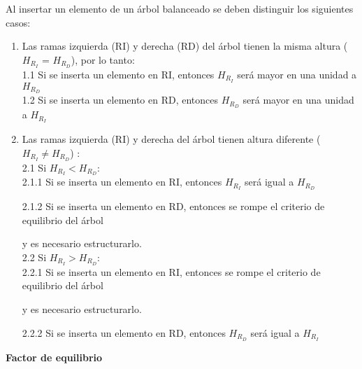 \documentclass{article}
\begin{document}
Al insertar un elemento de un árbol balanceado se deben distinguir los siguientes casos:

\begin{enumerate}
\item Las ramas izquierda (RI) y derecha (RD) del árbol tienen la misma altura ($H_{R_I}$ = $H_{R_D}$), por lo tanto:\\

            1.1 Si se inserta un elemento en RI, entonces $H_{R_I}$ será mayor en una unidad a $H_{R_D}$ \\
            1.2 Si se inserta un elemento en RD, entonces $H_{R_D}$ será mayor en una unidad a $H_{R_I}$\\
            
\item Las ramas izquierda (RI) y derecha del árbol tienen altura diferente ($H_{R_I} \neq H_{R_D}$) : \\  

            2.1 Si $H_{R_I} < H_{R_D}$:\\
            
\hspace{1cm} 2.1.1 Si se inserta un elemento en RI, entonces $H_{R_I}$ será igual a $H_{R_D}$

\hspace{1cm} 2.1.2 Si se inserta un elemento en RD, entonces se rompe el criterio de 
equilibrio del árbol 

\hspace{1.8cm} y es necesario estructurarlo.\\

            2.2 Si $H_{R_I} > H_{R_D}$:\\
            
\hspace{1cm} 2.2.1 Si se inserta un elemento en RI, entonces se rompe el criterio de equilibrio del árbol 

\hspace{1.8cm} y es necesario estructurarlo.

\hspace{1cm} 2.2.2 Si se inserta un elemento en RD, entonces $H_{R_D}$ será igual a $H_{R_I}$
\end{enumerate}

\textbf{Factor de equilibrio}\\
\end{document}
